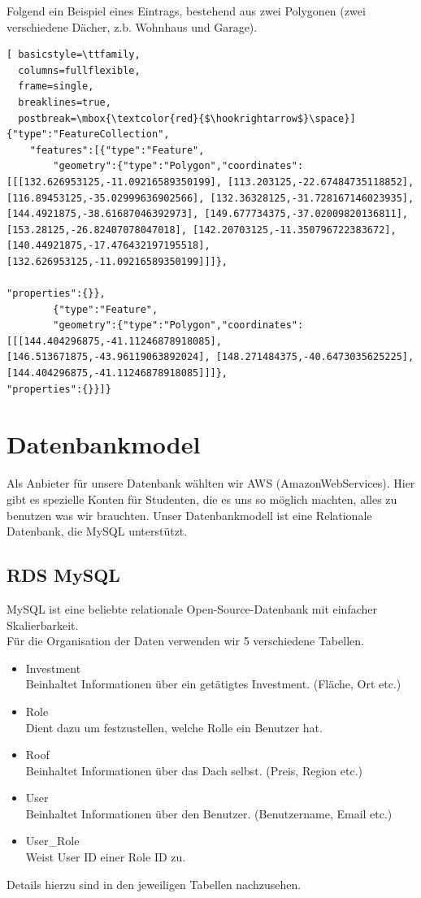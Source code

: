 \documentclass[12pt,a4paper]{article}
\begin{document}
Folgend ein Beispiel eines Eintrags, bestehend aus zwei Polygonen (zwei verschiedene Dächer, z.b. Wohnhaus und Garage). 

    \begin{lstlisting}[ basicstyle=\ttfamily,
  columns=fullflexible,
  frame=single,
  breaklines=true,
  postbreak=\mbox{\textcolor{red}{$\hookrightarrow$}\space}]
{"type":"FeatureCollection",
	"features":[{"type":"Feature",
		"geometry":{"type":"Polygon","coordinates":[[[132.626953125,-11.09216589350199], [113.203125,-22.67484735118852], [116.89453125,-35.02999636902566], [132.36328125,-31.728167146023935], [144.4921875,-38.61687046392973], [149.677734375,-37.02009820136811], [153.28125,-26.82407078047018], [142.20703125,-11.350796722383672], [140.44921875,-17.476432197195518], [132.626953125,-11.09216589350199]]]},
        
"properties":{}},
		{"type":"Feature",
		"geometry":{"type":"Polygon","coordinates":[[[144.404296875,-41.11246878918085], [146.513671875,-43.96119063892024], [148.271484375,-40.6473035625225], [144.404296875,-41.11246878918085]]]},
"properties":{}}]}
\end{lstlisting}



\section{Datenbankmodel}
Als Anbieter für unsere Datenbank wählten wir AWS (AmazonWebServices). Hier gibt es spezielle Konten für Studenten, die es uns so möglich machten, alles zu benutzen was wir brauchten. Unser Datenbankmodell ist eine Relationale Datenbank, die MySQL unterstützt.


\subsection{RDS MySQL}
MySQL ist eine beliebte relationale Open-Source-Datenbank mit einfacher Skalierbarkeit.\\
Für die Organisation der Daten verwenden wir 5 verschiedene Tabellen. 
\begin{itemize}
	\item[\textbullet] Investment\\
	Beinhaltet Informationen über ein getätigtes Investment. (Fläche, Ort etc.)
	\item[\textbullet] Role\\
	Dient dazu um festzustellen, welche Rolle ein Benutzer hat.
	\item[\textbullet] Roof\\
	Beinhaltet Informationen über das Dach selbst. (Preis, Region etc.)
	\item[\textbullet] User\\
	Beinhaltet Informationen über den Benutzer. (Benutzername, Email etc.)
	\item[\textbullet] User\_Role\\
	Weist User ID einer Role ID zu.
\end{itemize}
Details hierzu sind in den jeweiligen Tabellen nachzusehen.\\
\end{document}

